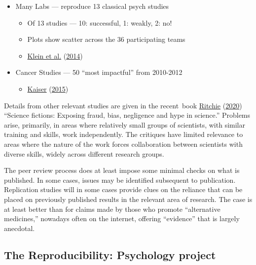 \documentclass[
  10pt,
  b5paper]{book}
\providecommand{\tightlist}{%
  \setlength{\itemsep}{0pt}\setlength{\parskip}{0pt}}
\begin{document}
\begin{itemize}
\tightlist
\item
  Many Labs --- reproduce 13 classical psych studies

  \begin{itemize}
  \tightlist
  \item
    Of 13 studies --- 10: successful, 1: weakly, 2: no!
  \item
    Plots show scatter across the 36 participating teams
  \item
    \protect\hyperlink{ref-r7_klein_others_2014}{Klein et al.} (\protect\hyperlink{ref-r7_klein_others_2014}{2014})
  \end{itemize}
\item
  Cancer Studies --- 50 ``most impactful'' from 2010-2012

  \begin{itemize}
  \tightlist
  \item
    \protect\hyperlink{ref-r5_kaiser_2015}{Kaiser} (\protect\hyperlink{ref-r5_kaiser_2015}{2015})
  \end{itemize}
\end{itemize}

Details from other relevant studies are given in the
recent~book \protect\hyperlink{ref-ritchie2020science}{Ritchie} (\protect\hyperlink{ref-ritchie2020science}{2020}) ``Science fictions: Exposing
fraud, bias, negligence and hype in science.''
Problems arise, primarily, in areas where relatively small
groups of scientists, with similar training and skills, work
independently. The critiques have limited relevance to
areas where the nature of the work forces collaboration
between scientists with diverse skills, widely across
different research groups.

The peer review process does at least impose some minimal
checks on what is published. In some cases, issues may
be identified subsequent to publication. Replication
studies will in some cases provide clues on the reliance
that can be placed on previously published results in the
relevant area of research. The case is at least better
than for claims made by those who promote ``alternative
medicines,'' nowadays often on the internet, offering
``evidence'' that is largely anecdotal.

\hypertarget{the-reproducibility-psychology-project}{%
\subsection*{The Reproducibility: Psychology project}\label{the-reproducibility-psychology-project}}
\end{document}
